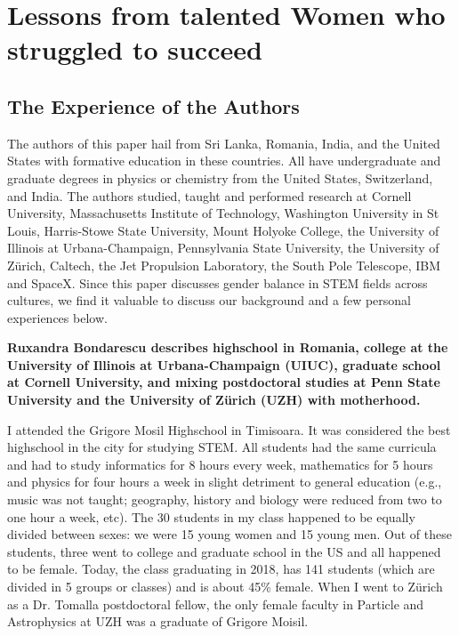 \documentclass[utf8]{frontiersSCNS} %
\begin{document}
\section{Lessons from talented Women who struggled to succeed}

 \subsection{The Experience of the Authors}
 \label{Sec10}
 The authors of this paper hail from Sri Lanka, Romania, India, and the United States with formative education in these countries.  All have undergraduate and graduate degrees in physics or chemistry from the United States, Switzerland, and India.   The authors studied, taught and performed research at Cornell University, Massachusetts Institute of Technology, Washington University in St Louis, Harris-Stowe State University, Mount Holyoke College, the University of Illinois at Urbana-Champaign, Pennsylvania State University, the University of Z\"{u}rich, Caltech, the Jet Propulsion Laboratory, the South Pole Telescope, IBM and SpaceX. Since this paper discusses gender balance in STEM fields across cultures, we find it valuable to discuss our background and a few personal experiences below.

{\bf Ruxandra Bondarescu describes highschool in Romania, college at the University of Illinois at Urbana-Champaign (UIUC), graduate school at Cornell University, and mixing postdoctoral studies at Penn State University and the University of Z\"{u}rich (UZH) with motherhood.}

I attended the Grigore Mosil Highschool in Timisoara. It was considered the best highschool in the city for studying STEM. All students had the same curricula and had to study informatics for 8 hours every week, mathematics for 5 hours and physics for four hours a week in slight detriment to general education (e.g., music was not taught; geography, history and biology were reduced from two to one hour a week, etc).  The 30 students in my class happened to be equally divided between sexes: we were 15 young women and 15 young men. Out of these students, three went to college and graduate school in the US and all happened to be female. Today, the class graduating in 2018, has 141 students (which are divided in 5 groups or classes) and is about 45\% female. When I went to Z\"{u}rich as a Dr. Tomalla postdoctoral fellow, the only female faculty in Particle and Astrophysics at UZH was a graduate of Grigore Moisil. 
\end{document}
